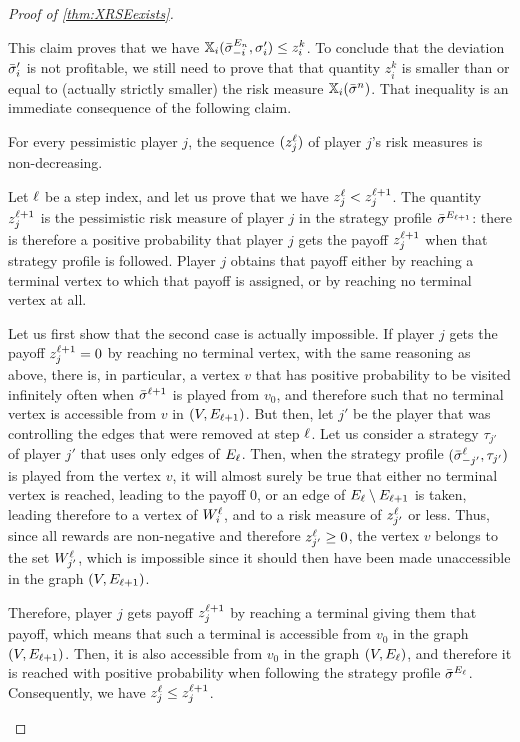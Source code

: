 \begin{proof}[Proof of \cref{thm:XRSEexists}]
\begin{claimproof}
    This claim proves that we have $\mathbb{X}_i({\bar{\sigma}}^{E_n}_{-i}, \sigma'_i) \leq z_i^k$.
    To conclude that the deviation ${\bar{\sigma}}'_i$ is not profitable, we still need to prove that that quantity $z_i^k$ is smaller than or equal to (actually strictly smaller) the risk measure $\mathbb{X}_i({\bar{\sigma}}^n)$.
    That inequality is an immediate consequence of the following claim.

\begin{claim}
    For every pessimistic player $j$, the sequence $(z_j^\ell)$ of player $j$'s risk measures is non-decreasing.
\end{claim}

\begin{claimproof}
    Let $\ell$ be a step index, and let us prove that we have $z_j^\ell < z_j^{\ell+1}$.
    The quantity $z_j^{\ell+1}$ is the pessimistic risk measure of player $j$ in the strategy profile ${\bar{\sigma}}^{E_{\ell+1}}$: there is therefore a positive probability that player $j$ gets the payoff $z_j^{\ell+1}$ when that strategy profile is followed.
    Player $j$ obtains that payoff either by reaching a terminal vertex to which that payoff is assigned, or by reaching no terminal vertex at all.

    Let us first show that the second case is actually impossible.
    If player $j$ gets the payoff $z_j^{\ell+1} = 0$ by reaching no terminal vertex, with the same reasoning as above, there is, in particular, a vertex $v$ that has positive probability to be visited infinitely often when ${\bar{\sigma}}^{\ell+1}$ is played from $v_0$, and therefore such that no terminal vertex is accessible from $v$ in $(V, E_{\ell+1})$.
    But then, let $j'$ be the player that was controlling the edges that were removed at step $\ell$.
    Let us consider a strategy $\tau_{j'}$ of player $j'$ that uses only edges of $E_\ell$.
    Then, when the strategy profile $({\bar{\sigma}}^\ell_{-j'}, \tau_{j'})$ is played from the vertex $v$, it will almost surely be true that either no terminal vertex is reached, leading to the payoff $0$, or an edge of $E_\ell \setminus E_{\ell+1}$ is taken, leading therefore to a vertex of $W_i^\ell$, and to a risk measure of $z_{j'}^\ell$ or less.
    Thus, since all rewards are non-negative and therefore $z_{j'}^\ell \geq 0$, the vertex $v$ belongs to the set $W_{j'}^\ell$, which is impossible since it should then have been made unaccessible in the graph $(V, E_{\ell+1})$.

    Therefore, player $j$ gets payoff $z_j^{\ell+1}$ by reaching a terminal giving them that payoff, which means that such a terminal is accessible from $v_0$ in the graph $(V, E_{\ell+1})$.
    Then, it is also accessible from $v_0$ in the graph $(V, E_\ell)$, and therefore it is reached with positive probability when following the strategy profile ${\bar{\sigma}}^{E_\ell}$.
    Consequently, we have $z_j^\ell \leq z_j^{\ell+1}$.
\end{claimproof}


\end{claimproof}
\end{proof}
